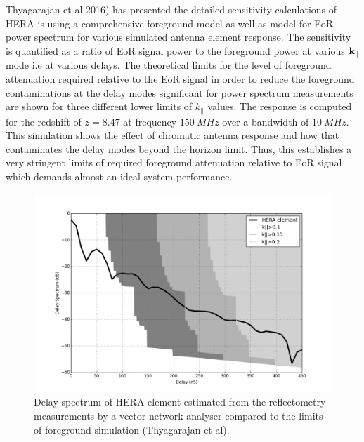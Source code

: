 \documentclass[twocolumn]{emulateapj}
\begin{document}
Thyagarajan et al 2016) has presented the detailed sensitivity calculations of HERA is using a comprehensive foreground model as well as model for EoR power spectrum for various simulated antenna element response. The sensitivity is quantified as a ratio of EoR signal power to the foreground power at various $\bold k_{\parallel}$ mode i.e at various delays. The theoretical limits for the level of foreground attenuation required relative to the EoR signal in order to reduce the foreground contaminations at the delay modes significant for power spectrum measurements are shown for three different lower limits of $k_\parallel$ values.  The response is computed for the redshift of $z=8.47$ at frequency $150~MHz$ over a bandwidth of $10~MHz$. This simulation shows the effect of chromatic antenna response and how that contaminates the delay modes beyond the horizon limit. Thus, this establishes a very stringent limits of required foreground attenuation relative to EoR signal which demands almost an ideal system performance. \\

\begin{figure}
\centering
\includegraphics[width=\linewidth]{GB_reflectometry_part3/plot/HERA_ds_fg_sim.png}
\caption{Delay spectrum of HERA element estimated from the reflectometry measurements by a vector network analyser compared to the limits of foreground simulation (Thyagarajan et al).}
\label{fig:sim_fg_Nithya}
\end{figure}
\end{document}
